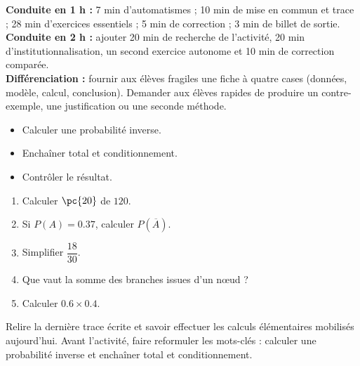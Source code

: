 \ifmxteacher
\begin{method}
\textbf{Conduite en 1 h :} 7 min d'automatismes ; 10 min de mise en commun et trace ; 28 min d'exercices essentiels ; 5 min de correction ; 3 min de billet de sortie.\\
\textbf{Conduite en 2 h :} ajouter 20 min de recherche de l'activité, 20 min d'institutionnalisation, un second exercice autonome et 10 min de correction comparée.\\
\textbf{Différenciation :} fournir aux élèves fragiles une fiche à quatre cases (données, modèle, calcul, conclusion). Demander aux élèves rapides de produire un contre-exemple, une justification ou une seconde méthode.
\end{method}
\fi
{}
    \begin{objectives}\begin{itemize}\item Calculer une probabilité inverse.\item Enchaîner total et conditionnement.\item Contrôler le résultat.\end{itemize}\end{objectives}
    \begin{fluency}\begin{enumerate}\item Calculer $\pc{20}$ de $120$. \item Si $P(A)=\num{0,37}$, calculer $P(\overline A)$. \item Simplifier $\dfrac{18}{30}$. \item Que vaut la somme des branches issues d'un nœud ? \item Calculer $\num{0,6}\times\num{0,4}$. \end{enumerate}\end{fluency}
    \begin{prerequisites}Relire la dernière trace écrite et savoir effectuer les calculs élémentaires mobilisés aujourd'hui. Avant l'activité, faire reformuler les mots-clés : calculer une probabilité inverse et enchaîner total et conditionnement.\end{prerequisites}

